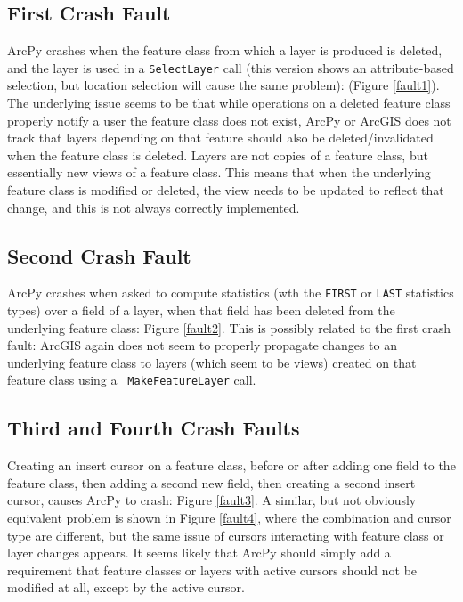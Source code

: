 \subsection{First Crash Fault}

ArcPy crashes when the feature class from which a layer is produced is
deleted, and the layer is used in a {\tt SelectLayer} call (this
version shows an attribute-based selection, but location selection
will cause the same problem): (Figure \ref{fault1}).  The underlying issue seems to be that
while operations on a deleted feature class properly notify a user the
feature class does not exist, ArcPy or ArcGIS does not track that
layers depending on that feature should also be deleted/invalidated
when the feature class is deleted.  Layers are not copies
of a feature class, but essentially new views of a feature class.
This means that when the underlying feature class is modified or
deleted, the view needs to be updated to reflect that change, and this
is not always correctly implemented.


\subsection{Second Crash Fault}

ArcPy crashes when asked to compute statistics (wth the {\tt FIRST} or
{\tt LAST} statistics types) over a field of a layer, when that field
has been deleted from the underlying feature class:  Figure
\ref{fault2}.  This is possibly related to the first crash fault:
ArcGIS again does not seem to properly propagate changes to an underlying
feature class to layers (which seem to be views) created on that feature class using a {\tt
  MakeFeatureLayer} call.



\subsection{Third and Fourth Crash Faults}

Creating an insert cursor on a feature class, before or after adding
one field to the feature class, then adding a second new field, then
creating a second insert cursor, causes ArcPy to crash:  Figure
\ref{fault3}.  A similar, but not obviously equivalent problem is
shown in Figure \ref{fault4}, where the combination and cursor type
are different, but the same issue of cursors interacting with feature
class or layer changes appears.  It seems likely that ArcPy should
simply add a requirement that feature classes or layers with active
cursors should not be modified at all, except by the active cursor.

